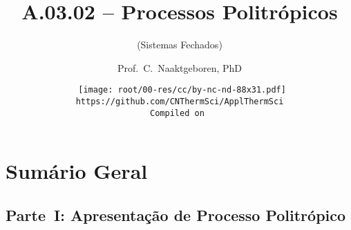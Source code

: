 \makeatletter
\immediate{} %
\makeatother


\title{A.03.02 -- Processos Politrópicos}
\subtitle{(Sistemas Fechados)}
\author{Prof.~C.~Naaktgeboren, PhD}
\date{{\scriptsize\tt%
    \texttt{[image: root/00-res/cc/by-nc-nd-88x31.pdf]}\\[\smallskipamount]
    https://github.com/CNThermSci/ApplThermSci\\
    Compiled on 
}}

\logo{%
    \parbox{158mm}{%
        \texttt{[image: root/00-res/UTFPR/UTFPR-logo-A.pdf]}\hfill%
        \texttt{[image: root/00-res/logo/CNThermSci-logo-A.pdf]}%
}} %
\frame{\titlepage}

\section*{Sumário Geral}

\subsection{Parte~I: Apresentação de Processo Politrópico}

